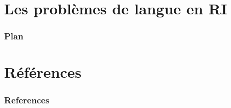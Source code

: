 \documentclass[12pt,aspectratio=43,dvipsnames,table]{beamer}
\begin{document}
\section{Les problèmes de langue en RI}


\begin{frame}
\frametitle{Plan}
\tableofcontents[sectionstyle=show,subsectionstyle=hide,subsubsectionstyle=hide]
\end{frame}


\begin{frame}
    \frametitle{}
\end{frame}


\begin{frame}
    \frametitle{}
\end{frame}


\section{Références}


\begin{frame}
    \frametitle{References}
    
    
\end{frame}
\end{document}
